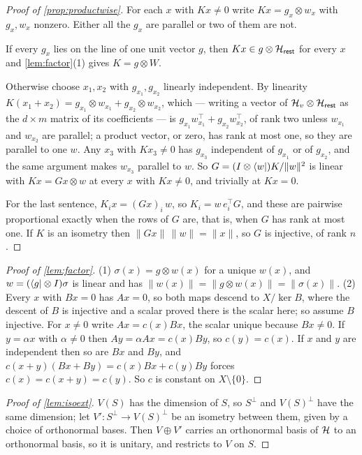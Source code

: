 \documentclass[acmsmall,screen,review,anonymous,nonacm]{acmart}
\begin{document}
\begin{proof}[Proof of \cref{prop:productwise}]
For each $x$ with $Kx \ne 0$ write $Kx = g_x \otimes w_x$ with $g_x, w_x$
nonzero. Either all the $g_x$ are parallel or two of them are not.

If every $g_x$ lies on the line of one unit vector $g$, then $Kx \in g
\otimes \mathcal{H}_{\mathsf{rest}}$ for every $x$ and \cref{lem:factor}(1) gives $K = g \otimes W$.

Otherwise choose $x_1, x_2$ with $g_{x_1}, g_{x_2}$ linearly independent. By
linearity $K(x_1 + x_2) = g_{x_1} \otimes w_{x_1} + g_{x_2} \otimes
w_{x_2}$, which --- writing a vector of $\mathcal{H}_{v} \otimes \mathcal{H}_{\mathsf{rest}}$ as the $d \times m$
matrix of its coefficients --- is $g_{x_1} w_{x_1}^{\top} +
g_{x_2} w_{x_2}^{\top}$, of rank two unless $w_{x_1}$ and $w_{x_2}$ are
parallel; a product vector, or zero, has rank at most one, so they are
parallel to one $w$. Any $x_3$ with $Kx_3 \ne 0$ has $g_{x_3}$ independent
of $g_{x_1}$ or of $g_{x_2}$, and the same argument makes $w_{x_3}$ parallel
to $w$. So $G = (I \otimes \langle w \rvert)K/\|w\|^{2}$ is linear with $Kx = Gx
\otimes w$ at every $x$ with $Kx \ne 0$, and trivially at $Kx = 0$.

For the last sentence, $K_i x = (Gx)_i\, w$, so $K_i = w\, e_i^{\top} G$,
and these are pairwise proportional exactly when the rows of $G$ are, that
is, when $G$ has rank at most one. If $K$ is an isometry then $\|Gx\|\,\|w\|
= \|x\|$, so $G$ is injective, of rank $n$.
\end{proof}
\begin{proof}[Proof of \cref{lem:factor}]
(1) $\sigma(x) = g \otimes w(x)$ for a unique $w(x)$, and $w = (\langle g \rvert
\otimes I)\sigma$ is linear and has $\lVert w(x)\rVert = \lVert g \otimes
w(x)\rVert = \lVert\sigma(x)\rVert$.
(2) Every $x$ with $Bx = 0$ has $Ax = 0$, so both maps descend to
$X/\ker B$, where the descent of $B$ is injective and a scalar proved there is the
scalar here; so assume $B$ injective.
For $x \ne 0$ write $Ax = c(x)Bx$, the scalar unique because $Bx \ne 0$.
If $y = \alpha x$ with $\alpha \ne 0$ then $Ay = \alpha Ax = c(x)By$, so
$c(y) = c(x)$. If $x$ and $y$ are independent then so are $Bx$ and $By$, and
$c(x+y)(Bx + By) = c(x)Bx + c(y)By$ forces $c(x) = c(x+y) = c(y)$. So $c$ is
constant on $X \setminus \{0\}$.
\end{proof}

\begin{proof}[Proof of \cref{lem:isoext}]
$V(S)$ has the dimension of $S$, so $S^{\perp}$ and $V(S)^{\perp}$ have
the same dimension; let $V' : S^{\perp} \to V(S)^{\perp}$ be an isometry
between them, given by a choice of orthonormal bases. Then $V \oplus V'$
carries an orthonormal basis of $\mathcal{H}$ to an orthonormal basis, so it is
unitary, and restricts to $V$ on $S$.
\end{proof}
\end{document}
